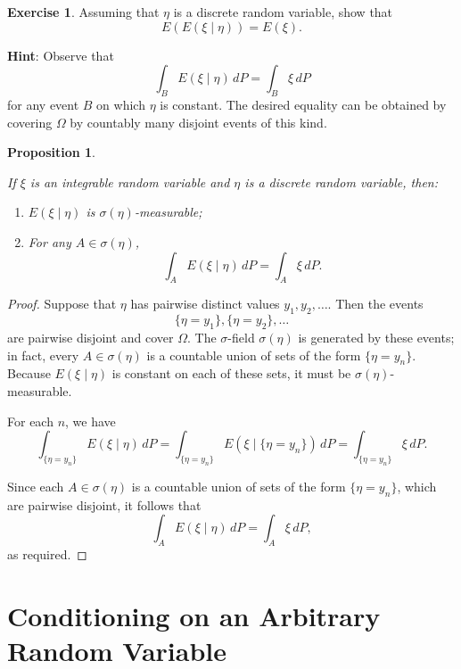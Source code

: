 \documentclass[
]{book}
\providecommand{\tightlist}{%
  \setlength{\itemsep}{0pt}\setlength{\parskip}{0pt}}
\newtheorem{proposition}{Proposition}[chapter]
\theoremstyle{definition}
\theoremstyle{definition}
\theoremstyle{definition}
\newtheorem{exercise}{Exercise}[chapter]
\theoremstyle{definition}
\theoremstyle{remark}
\begin{document}
\begin{exercise}
\protect\hypertarget{exr:unnamed-chunk-51}{}\label{exr:unnamed-chunk-51}Assuming that \(\eta\) is a discrete random variable, show that
\[
E(E(\xi \mid \eta)) = E(\xi).
\]

\textbf{Hint}: Observe that
\[
\int_B E(\xi \mid \eta) \, dP = \int_B \xi \, dP
\]
for any event \(B\) on which \(\eta\) is constant. The desired equality can be obtained by covering \(\Omega\) by countably many disjoint events of this kind.
\end{exercise}

\begin{proposition}
\protect\hypertarget{prp:unnamed-chunk-52}{}\label{prp:unnamed-chunk-52}

If \(\xi\) is an integrable random variable and \(\eta\) is a discrete random variable, then:

\begin{enumerate}
\def\labelenumi{\arabic{enumi}.}
\tightlist
\item
  \(E(\xi \mid \eta)\) is \(\sigma(\eta)\)-measurable;
\item
  For any \(A \in \sigma(\eta)\),
  \[
  \int_A E(\xi \mid \eta) \, dP = \int_A \xi \, dP.
  \]
\end{enumerate}

\end{proposition}

\begin{proof}
Suppose that \(\eta\) has pairwise distinct values \(y_1, y_2, \ldots\). Then the events
\[
\{\eta = y_1\}, \{\eta = y_2\}, \ldots
\]
are pairwise disjoint and cover \(\Omega\). The \(\sigma\)-field \(\sigma(\eta)\) is generated by these events; in fact, every \(A \in \sigma(\eta)\) is a countable union of sets of the form \(\{\eta = y_n\}\). Because \(E(\xi \mid \eta)\) is constant on each of these sets, it must be \(\sigma(\eta)\)-measurable.

For each \(n\), we have
\[
\int_{\{\eta = y_n\}} E(\xi \mid \eta) \, dP = \int_{\{\eta = y_n\}} E(\xi \mid \{\eta = y_n\}) \, dP = \int_{\{\eta = y_n\}} \xi \, dP.
\]

Since each \(A \in \sigma(\eta)\) is a countable union of sets of the form \(\{\eta = y_n\}\), which are pairwise disjoint, it follows that
\[
\int_A E(\xi \mid \eta) \, dP = \int_A \xi \, dP,
\]
as required.
\end{proof}

\section{Conditioning on an Arbitrary Random Variable}\label{conditioning-on-an-arbitrary-random-variable}
\end{document}
